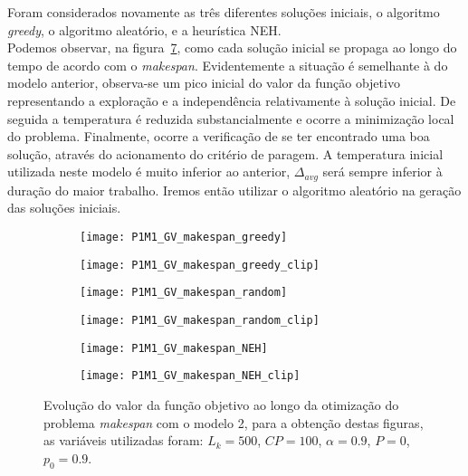 Foram considerados novamente as três diferentes soluções iniciais, o algoritmo \textit{greedy}, o algoritmo aleatório, e a heurística NEH.\\
Podemos observar, na figura~\ref{fig:P1M1_GV_dif_sol_ini}, como cada solução inicial se propaga ao longo do tempo de acordo com o \textit{makespan}. Evidentemente a situação é semelhante à do modelo anterior, observa-se um pico inicial do valor da função objetivo representando a exploração e a independência relativamente à solução inicial. De seguida a temperatura é reduzida substancialmente e ocorre a minimização local do problema. Finalmente, ocorre a verificação de se ter encontrado uma boa solução, através do acionamento do critério de paragem. A temperatura inicial utilizada neste modelo é muito inferior ao anterior, $\Delta_{avg}$ será sempre inferior à duração do maior trabalho. Iremos então utilizar o algoritmo aleatório na geração das soluções iniciais.\\
\begin{figure}[h]
    \centering
    \begin{subfigure}{0.49\textwidth}
        \centering
        \texttt{[image: P1M1\_GV\_makespan\_greedy]}
        \caption{}
        \label{fig:P1M1_GV_makespan_greedy}
    \end{subfigure}
    \hfill
    \begin{subfigure}{0.49\textwidth}
        \centering
        \texttt{[image: P1M1\_GV\_makespan\_greedy\_clip]}
        \caption{}
        \label{fig:P1M1_GV_makespan_greedy_clip}
    \end{subfigure}
    
    \begin{subfigure}{0.49\textwidth}
        \centering
        \texttt{[image: P1M1\_GV\_makespan\_random]}
        \caption{}
        \label{fig:P1M1_GV_makespan_random}
    \end{subfigure}
    \hfill
    \begin{subfigure}{0.49\textwidth}
        \centering
        \texttt{[image: P1M1\_GV\_makespan\_random\_clip]}
        \caption{}
        \label{fig:P1M1_GV_makespan_random_clip}
    \end{subfigure}
    
    \begin{subfigure}{0.49\textwidth}
        \centering
        \texttt{[image: P1M1\_GV\_makespan\_NEH]}
        \caption{}
        \label{fig:P1M1_GV_makespan_NEH}
    \end{subfigure}
    \hfill
    \begin{subfigure}{0.49\textwidth}
        \centering
        \texttt{[image: P1M1\_GV\_makespan\_NEH\_clip]}
        \caption{}
        \label{fig:P1M1_GV_makespan_NEH_clip}
    \end{subfigure}
    \caption{Evolução do valor da função objetivo ao longo da otimização do problema \textit{makespan} com o modelo 2, para a obtenção destas figuras, as variáveis utilizadas foram: $L_{k}=500$, $CP=100$, $\alpha=0.9$, $P=0$, $p_{0}=0.9$.}
    \label{fig:P1M1_GV_dif_sol_ini}
\end{figure}

